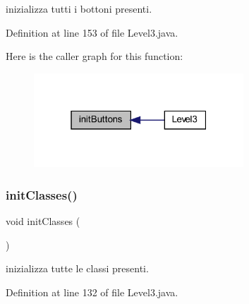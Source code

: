inizializza tutti i bottoni presenti. 



Definition at line 153 of file Level3.\+java.

Here is the caller graph for this function\+:\nopagebreak
\begin{figure}[H]
\begin{center}
\leavevmode
\includegraphics[width=223pt]{classscenes_1_1_level3_a27d3ba5afb772cc36c9a432c28975ace_icgraph}
\end{center}
\end{figure}
\mbox{\label{classscenes_1_1_level3_afe125d345675ffefe8da7e96d39773f3}} 
\subsubsection{\texorpdfstring{init\+Classes()}{initClasses()}}
{\footnotesize\ttfamily void init\+Classes (\begin{DoxyParamCaption}{ }\end{DoxyParamCaption})}



inizializza tutte le classi presenti. 



Definition at line 132 of file Level3.\+java.

